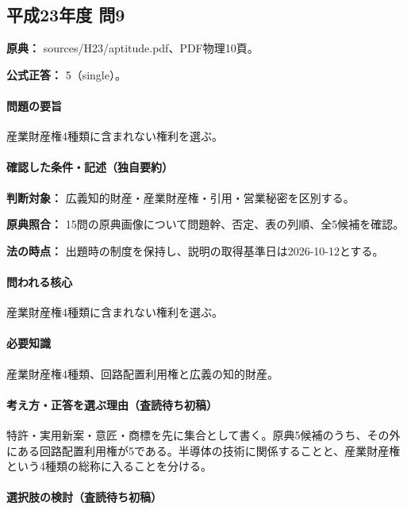 \subsection{平成23年度 問9}
\label{q:h23-reg-apt-09}

\noindent\textbf{原典：} sources/H23/aptitude.pdf、PDF物理10頁。

\textbf{公式正答：} 5（single）。

\paragraph{問題の要旨} 産業財産権4種類に含まれない権利を選ぶ。

\paragraph{確認した条件・記述（独自要約）}\mbox{}\par

\noindent\textbf{判断対象：} 広義知的財産・産業財産権・引用・営業秘密を区別する。\par

\noindent\textbf{原典照合：} 15問の原典画像について問題幹、否定、表の列順、全5候補を確認。\par

\noindent\textbf{法の時点：} 出題時の制度を保持し、説明の取得基準日は2026-10-12とする。\par

\paragraph{問われる核心} 産業財産権4種類に含まれない権利を選ぶ。

\paragraph{必要知識} 産業財産権4種類、回路配置利用権と広義の知的財産。

\paragraph{考え方・正答を選ぶ理由（査読待ち初稿）} 特許・実用新案・意匠・商標を先に集合として書く。原典5候補のうち、その外にある回路配置利用権が5である。半導体の技術に関係することと、産業財産権という4種類の総称に入ることを分ける。

\paragraph{選択肢の検討（査読待ち初稿）}\mbox{}\par


